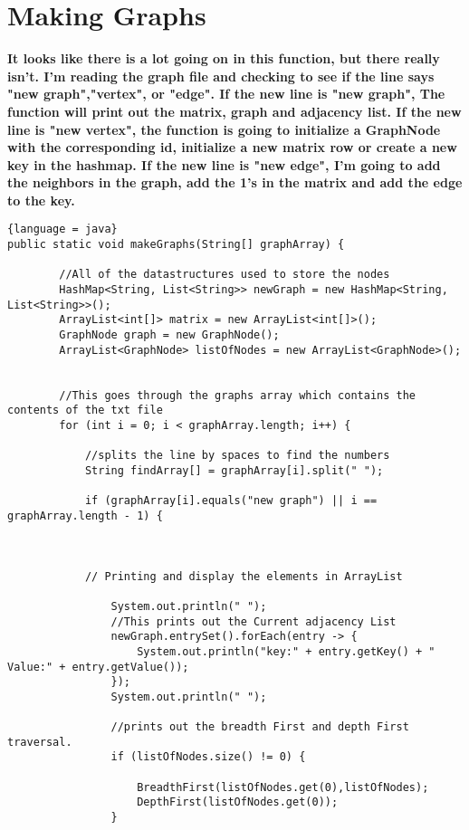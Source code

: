 \documentclass{article}
\begin{document}
\section{Making Graphs}
\textbf{It looks like there is a lot going on in this function, but there really isn't. I'm reading the graph file and checking to see if the line says "new graph","vertex", or "edge". If the new line is "new graph", The function will print out the matrix, graph and adjacency list. If the new line is "new vertex", the function is going to initialize a GraphNode with the corresponding id, initialize a new matrix row or create a new key in the hashmap. If the new line is "new edge", I'm going to add the neighbors in the graph, add the 1's in the matrix and add the edge to the key.}
\begin{lstlisting}{language = java}
public static void makeGraphs(String[] graphArray) {

        //All of the datastructures used to store the nodes
        HashMap<String, List<String>> newGraph = new HashMap<String, List<String>>();
        ArrayList<int[]> matrix = new ArrayList<int[]>();
        GraphNode graph = new GraphNode();
        ArrayList<GraphNode> listOfNodes = new ArrayList<GraphNode>();
        

        //This goes through the graphs array which contains the contents of the txt file
        for (int i = 0; i < graphArray.length; i++) {

            //splits the line by spaces to find the numbers
            String findArray[] = graphArray[i].split(" ");

            if (graphArray[i].equals("new graph") || i == graphArray.length - 1) {


           
            // Printing and display the elements in ArrayList
             
                System.out.println(" ");
                //This prints out the Current adjacency List
                newGraph.entrySet().forEach(entry -> {
                    System.out.println("key:" + entry.getKey() + " Value:" + entry.getValue());
                });
                System.out.println(" ");

                //prints out the breadth First and depth First traversal.
                if (listOfNodes.size() != 0) {
                    
                    BreadthFirst(listOfNodes.get(0),listOfNodes);
                    DepthFirst(listOfNodes.get(0));
                }
                

\end{lstlisting}
\end{document}

